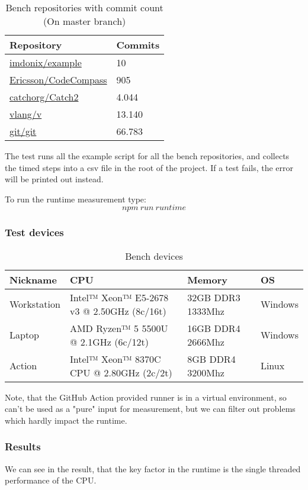 \begin{table}[H]
	\centering
	\begin{tabular}{ | m{} | m{} | }
		\hline
		\textbf{Repository} & \textbf{Commits} \\
		\hline \hline
		\href{https://github.com/imdonix/example}{imdonix/example} & 10 \\
		\hline
		\href{https://github.com/Ericsson/CodeCompass}{Ericsson/CodeCompass} & 905 \\
		\hline
		\href{https://github.com/catchorg/Catch2}{catchorg/Catch2} & 4.044 \\
		\hline
		\href{https://github.com/vlang/v}{vlang/v} & 13.140 \\
		\hline
		\href{https://github.com/git/git}{git/git} & 66.783 \\
		\hline
	\end{tabular}
	\caption{Bench repositories with commit count (On master branch)}
	\label{tab:runtime}
\end{table}

The test runs all the example script for all the bench repositories, and collects the timed steps into a csv file in the root of the project. If a test fails, the error will be printed out instead.

To run the runtime measurement type:
\[npm\ run\ runtime\]

\subsubsection{Test devices}

\begin{table}[H]
	\centering
	\begin{tabular}{ | m{} | m{} | m{} |  m{} | }
		\hline
		\textbf{Nickname} & \textbf{CPU} & \textbf{Memory} & \textbf{OS}  \\
		\hline \hline
		Workstation & Intel™ Xeon™ E5-2678 v3 @ 2.50GHz (8c/16t) & 32GB DDR3 1333Mhz  & Windows \\ 
		\hline
		Laptop & AMD Ryzen™ 5 5500U @ 2.1GHz (6c/12t) & 16GB DDR4 2666Mhz & Windows \\
		\hline
		Action & Intel™ Xeon™ 8370C CPU @ 2.80GHz (2c/2t) & 8GB DDR4 3200Mhz & Linux \\
		\hline
	\end{tabular}
	\caption{Bench devices}
	\label{tab:devices}
\end{table}

Note, that the GitHub Action provided runner is in a virtual environment, so can't be used as a "pure" input for measurement, but we can filter out problems which hardly impact the runtime.   

\subsubsection{Results}



We can see in the result, that the key factor in the runtime is the single threaded performance of the CPU. 